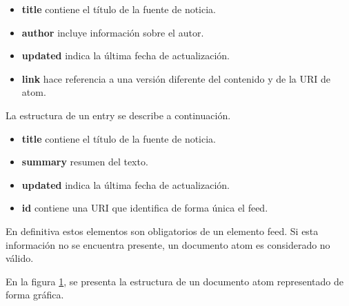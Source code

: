 \begin{itemize}

\item \textbf{title} contiene el título de la fuente de noticia.
\item \textbf{author} incluye información sobre el autor.
\item \textbf{updated} indica la última fecha de actualización.
\item \textbf{link} hace referencia a una versión diferente del contenido
y de la URI de atom.

\end{itemize}

La estructura de un entry se describe a continuación.

\begin{itemize}

\item \textbf{title} contiene el título de la fuente de noticia.
\item \textbf{summary} resumen del texto.
\item \textbf{updated} indica la última fecha de actualización.
\item \textbf{id} contiene una URI que identifica de forma única el feed.

\end{itemize}

En definitiva estos elementos son obligatorios de un elemento feed. Si esta
información no se encuentra presente, un documento atom es considerado no
válido. \cite{wittenbrink2005rss}

En la figura \ref{fig:Estructura de un documento Atom}, se presenta la
estructura de un documento atom representado de forma gráfica.

\begin{figure}[!ht]
\centering
	\label{fig:Estructura de un documento Atom}
\end{figure}
